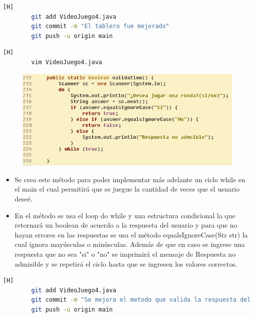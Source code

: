 \documentclass{article}
\begin{document}
	
	\begin{lstlisting}[language=bash,caption={Commit: 8a5f07948da6ece26389a11919f8118d45bcea51}][H]
		git add VideoJuego4.java
		git commit -m "El tablero fue mejorado"			
		git push -u origin main
	\end{lstlisting}
	
	
	
	
	
	
	
	
	\begin{lstlisting}[language=bash,caption={Se crea un método que valida la respuesta del jugador}][H]
		vim VideoJuego4.java
	\end{lstlisting}
	
	\begin{figure}[H]
		\centering
		\includegraphics[width=1\textwidth,keepaspectratio]{img/validation.jpg}
	\end{figure}
	
	\begin{itemize}	
		\item Se crea este método para poder implementar más adelante un ciclo while en el main el cual permitirá que se juegue la cantidad de veces que el usuario deseé. 
		\item En el método se usa el loop do while y una estructura condicional la que retornará un boolean de acuerdo a la respuesta del usuario y para que no hayan errores en las respuestas se usa el método equalsIgnoreCase(Str str) la cual ignora  mayúsculas o minúsculas. Además de que en caso se ingrese una respuesta que no sea "si" o "no" se imprimirá el mensaje de Respuesta no admisible y se repetirá el ciclo hasta que se ingresen los valores correctos.
	\end{itemize}
	
	
	\begin{lstlisting}[language=bash,caption={Commit: 47116e7456c1488e24e11bcd3518f2be3ec47bed}][H]
		git add VideoJuego4.java
		git commit -m "Se mejora el metodo que valida la respuesta del jugador"			
		git push -u origin main
	\end{lstlisting}
	
\end{document}
